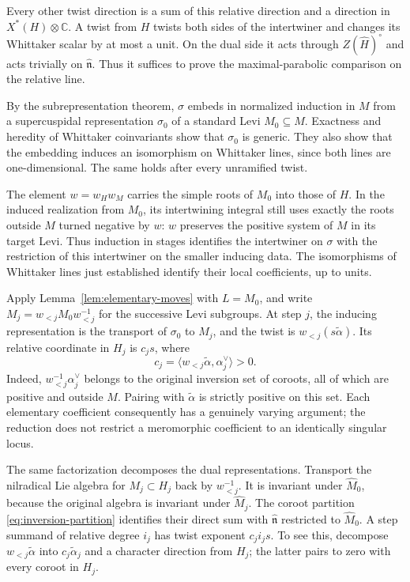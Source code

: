 Every other twist direction is a sum of this relative direction and a
direction in $X^*(H)\otimes\mathbb C$.  A twist from $H$ twists both
sides of the intertwiner and changes its Whittaker scalar by at most
a unit.  On the dual side it acts through $Z(\widehat H)^\circ$ and
acts trivially on $\widehat{\mathfrak n}$.  Thus it suffices to prove
the maximal-parabolic comparison on the relative line.

By the subrepresentation theorem, $\sigma$ embeds in normalized
induction in $M$ from a supercuspidal representation $\sigma_0$ of a
standard Levi $M_0\subseteq M$.  Exactness and heredity of Whittaker
coinvariants show that $\sigma_0$ is generic.  They also show that the
embedding induces an isomorphism on Whittaker lines, since both lines
are one-dimensional.  The same holds after every unramified twist.

The element $w=w_Hw_M$ carries the simple roots of $M_0$ into those of
$H$.  In the induced realization from $M_0$, its intertwining integral
still uses exactly the roots outside $M$ turned negative by $w$:
$w$ preserves the positive system of $M$ in its target Levi.  Thus
induction in stages identifies the intertwiner on $\sigma$ with the
restriction of this intertwiner on the smaller inducing data.  The
isomorphisms of Whittaker lines just established identify their local
coefficients, up to units.

Apply Lemma~\ref{lem:elementary-moves} with $L=M_0$, and write
$M_j=w_{<j}M_0w_{<j}^{-1}$ for the successive Levi subgroups.  At step $j$,
the inducing representation is the transport of $\sigma_0$ to $M_j$,
and the twist is $w_{<j}(s\widetilde\alpha)$.  Its relative coordinate
in $H_j$ is $c_js$, where
\begin{equation}
 c_j=\langle w_{<j}\widetilde\alpha,\alpha_j^\vee\rangle>0.
 \label{eq:relative-slope}
\end{equation}
Indeed, $w_{<j}^{-1}\alpha_j^\vee$ belongs to the original inversion
set of coroots, all of which are positive and outside $M$.  Pairing
with $\widetilde\alpha$ is strictly positive on this set.  Each
elementary coefficient consequently has a genuinely varying argument;
the reduction does not restrict a meromorphic coefficient to an
identically singular locus.

The same factorization decomposes the dual representations.  Transport
the nilradical Lie algebra for $M_j\subset H_j$ back by $w_{<j}^{-1}$.
It is invariant under $\widehat M_0$, because the original algebra is
invariant under $\widehat M_j$.  The coroot partition
\eqref{eq:inversion-partition} identifies their direct sum with
$\widehat{\mathfrak n}$ restricted to $\widehat M_0$.  A step summand
of relative degree $i_j$ has twist exponent $c_ji_js$.  To see this,
decompose $w_{<j}\widetilde\alpha$ into
$c_j\widetilde\alpha_j$ and a character direction from $H_j$; the
latter pairs to zero with every coroot in $H_j$.

